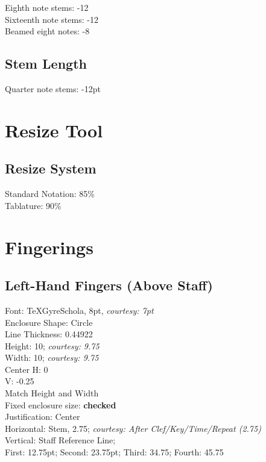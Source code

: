 \documentclass[unicode,hyperfootnotes=false,xetex,colorlinks=true,nofonts,nobib]{tufte-book} %
\begin{document}
Eighth note stems: -12\\
Sixteenth note stems: -12\\
Beamed eight notes: -8

\section{Stem Length}
\label{sec:stem-length}

Quarter note stems: -12pt

\chapter{Resize Tool}
\label{sec:resize-tool}

\section{Resize System}
\label{sec:resize-system}

Standard Notation: 85\%\\

\noindent Tablature: 90\%

\chapter{Fingerings}
\label{sec:fingerings}

\section{Left-Hand Fingers (Above Staff)}
\label{sec:left-hand-fingers}

Font: TeXGyreSchola, 8pt, \emph{courtesy: 7pt}\\
Enclosure Shape: Circle\\
Line Thickness: 0.44922\\
Height: 10; \emph{courtesy: 9.75}\\
Width: 10; \emph{courtesy: 9.75}\\
Center H: 0\\
V: -0.25\\
Match Height and Width\\
Fixed enclosure size: \textbf{checked}\\
Justification: Center\\
Horizontal: Stem, 2.75; \emph{courtesy: After Clef/Key/Time/Repeat (2.75)}\\
Vertical: Staff Reference Line;\\
First: 12.75pt; Second: 23.75pt; Third: 34.75; Fourth: 45.75
\end{document}
